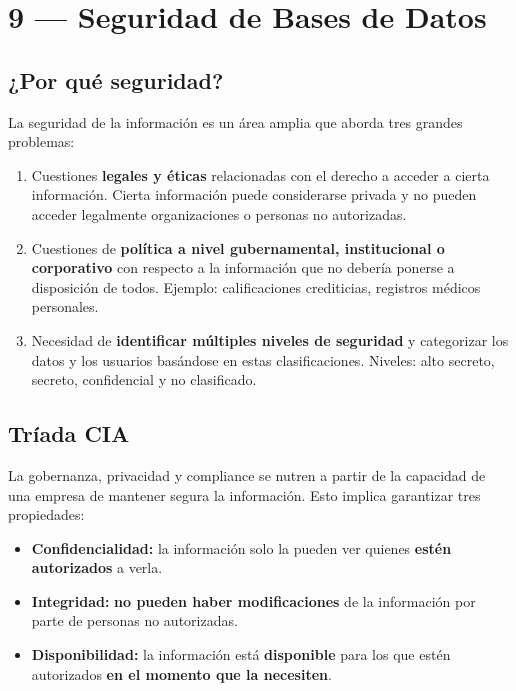 \documentclass[11pt, a4paper]{article}
\begin{document}
\section{9 — Seguridad de Bases de Datos}

\subsection{¿Por qué seguridad?}

La seguridad de la información es un área amplia que aborda tres grandes problemas:
\begin{enumerate}
	\item Cuestiones \textbf{legales y éticas} relacionadas con el derecho a acceder a cierta información. Cierta información puede considerarse privada y no pueden acceder legalmente organizaciones o personas no autorizadas.
	\item Cuestiones de \textbf{política a nivel gubernamental, institucional o corporativo} con respecto a la información que no debería ponerse a disposición de todos. Ejemplo: calificaciones crediticias, registros médicos personales.
	\item Necesidad de \textbf{identificar múltiples niveles de seguridad} y categorizar los datos y los usuarios basándose en estas clasificaciones. Niveles: alto secreto, secreto, confidencial y no clasificado.
\end{enumerate}

\subsection{Tríada CIA}

La gobernanza, privacidad y compliance se nutren a partir de la capacidad de una empresa de mantener segura la información. Esto implica garantizar tres propiedades:

\begin{itemize}
	\item \textbf{Confidencialidad:} la información solo la pueden ver quienes \textbf{estén autorizados} a verla.
	\item \textbf{Integridad:} \textbf{no pueden haber modificaciones} de la información por parte de personas no autorizadas.
	\item \textbf{Disponibilidad:} la información está \textbf{disponible} para los que estén autorizados \textbf{en el momento que la necesiten}.
\end{itemize}
\end{document}

